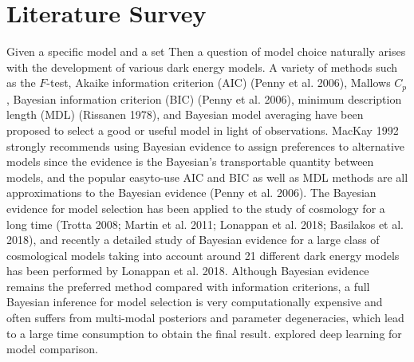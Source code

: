 \section{Literature Survey}
Given a specific model and a set Then a question of model choice naturally arises with the development of various dark energy models. A variety of methods such as the $F$-test, Akaike information criterion (AIC) (Penny et al. 2006), Mallows $C_{p}$, Bayesian information criterion (BIC) (Penny et al. 2006), minimum description length (MDL) (Rissanen 1978), and Bayesian model averaging have been proposed to select a good or useful model in light of observations. MacKay 1992 strongly recommends using Bayesian evidence to assign preferences to alternative models since the evidence is the Bayesian's transportable quantity between models, and the popular easyto-use AIC and BIC as well as MDL methods are all approximations to the Bayesian evidence (Penny et al. 2006). The Bayesian evidence for model selection has been applied to the study of cosmology for a long time (Trotta 2008; Martin et al. 2011; Lonappan et al. 2018; Basilakos et al. 2018), and recently a detailed study of Bayesian evidence for a large class of cosmological models taking into account around 21 different dark energy models has been performed by Lonappan et al. 2018. Although Bayesian evidence remains the preferred method compared with information criterions, a full Bayesian inference for model selection is very computationally expensive and often suffers from multi-modal posteriors and parameter degeneracies, which lead to a large time consumption to obtain the final result. \cite{li2019model} explored deep learning for model comparison.